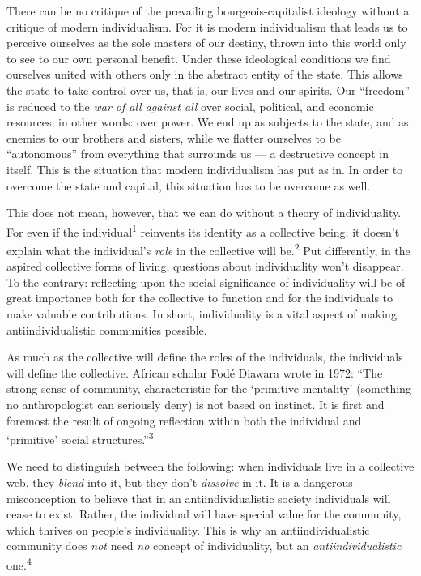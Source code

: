 There can be no critique of the prevailing bourgeois-capitalist ideology without
a critique of modern individualism. For it is modern individualism that leads us
to perceive ourselves as the sole masters of our destiny, thrown into this world
only to see to our own personal benefit. Under these ideological conditions we
find ourselves united with others only in the abstract entity of the state. This
allows the state to take control over us, that is, our lives and our spirits.
Our “freedom” is reduced to the \textit{war of all against all} over social,
political, and economic resources, in other words: over power. We end up as
subjects to the state, and as enemies to our brothers and sisters, while we
flatter ourselves to be “autonomous” from everything that surrounds us — a
destructive concept in itself. This is the situation that modern individualism
has put as in. In order to overcome the state and capital, this situation has to
be overcome as well.

This does not mean, however, that we can do without a theory of individuality.
For even if the individual\textsuperscript{1} reinvents its identity as a
collective being, it doesn’t explain what the individual’s \textit{role} in the
collective will be.\textsuperscript{2} Put differently, in the aspired
collective forms of living, questions about individuality won’t disappear. To
the contrary: reflecting upon the social significance of individuality will be
of great importance both for the collective to function and for the individuals
to make valuable contributions. In short, individuality is a vital aspect of
making antiindividualistic communities possible.

As much as the collective will define the roles of the individuals, the
individuals will define the collective. African scholar Fodé Diawara wrote in
1972: “The strong sense of community, characteristic for the ‘primitive
mentality’ (something no anthropologist can seriously deny) is not based on
instinct. It is first and foremost the result of ongoing reflection within both
the individual and ‘primitive’ social structures.”\textsuperscript{3}

We need to distinguish between the following: when individuals live in a
collective web, they \textit{blend} into it, but they don’t \textit{dissolve} in
it. It is a dangerous misconception to believe that in an antiindividualistic
society individuals will cease to exist. Rather, the individual will have
special value for the community, which thrives on people’s individuality. This
is why an antiindividualistic community does \textit{not} need \textit{no}
concept of individuality, but an \textit{antiindividualistic}
one.\textsuperscript{4}

